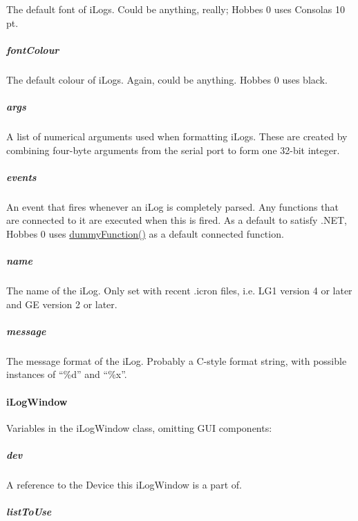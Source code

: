 \documentclass[12pt,letterpaper]{article}
\begin{document}
The default font of iLogs. Could be anything, really; Hobbes 0 uses Consolas 10 pt.



%
%
\subparagraph{fontColour}
\label{4.6.2.3.2}

The default colour of iLogs. Again, could be anything. Hobbes 0 uses black.



%
%
\subparagraph{args}
\label{4.6.2.3.3}

A list of numerical arguments used when formatting iLogs. These are created by combining four-byte arguments from the serial port to form one 32-bit integer.



%
%
\subparagraph{events}
\label{4.6.2.3.4}

An event that fires whenever an iLog is completely parsed. Any functions that are connected to it are executed when this is fired. As a default to satisfy .NET, Hobbes 0 uses \hyperref[4.6.1.0]{dummyFunction()} as a default connected function.



%
%
\subparagraph{name}
\label{4.6.2.3.5}

The name of the iLog. Only set with recent .icron files, i.e. LG1 version 4 or later and GE version 2 or later.



%
%
\subparagraph{message}
\label{4.6.2.3.6}

The message format of the iLog. Probably a C-style format string, with possible instances of ``\%d'' and ``\%x''.



%
%
\paragraph{iLogWindow}
\label{4.6.2.4}

Variables in the iLogWindow class, omitting GUI components:

\setcounter{subparagraph}{-1}



%
%
\subparagraph{dev}
\label{4.6.2.4.0}

A reference to the Device this iLogWindow is a part of.



%
%
\subparagraph{listToUse}
\label{4.6.2.4.1}
\end{document}
